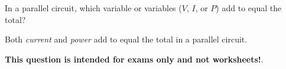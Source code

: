 

In a parallel circuit, which variable or variables ($V$, $I$, or $P$) add to equal the total?







Both {\it current} and {\it power} add to equal the total in a parallel circuit.







{\bf This question is intended for exams only and not worksheets!}.



